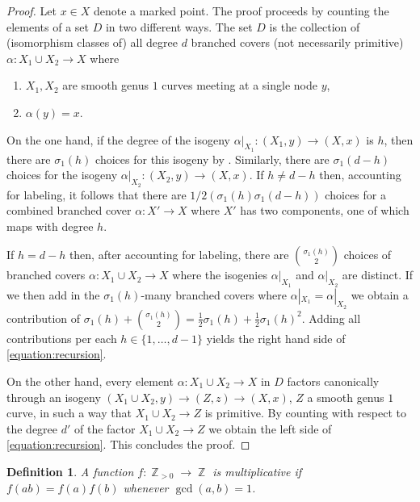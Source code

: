 \documentclass[reqno, 11pt]{amsart}
\newtheorem{definition}[theorem]{Definition}
\DeclareMathOperator{\Z}{\mathbb{Z}}
\begin{document}
\begin{proof}
    Let $x \in X$ denote a marked point. The proof proceeds by counting the elements of a set $D$ in two different ways.  The set $D$ is the collection of (isomorphism classes of) all degree $d$ branched covers (not necessarily primitive) $\alpha: X_{1} \cup X_{2} \to X$ where 
    \begin{enumerate}
        \item $X_{1},X_{2}$ are smooth genus $1$ curves meeting at a single node $y$,
        \item $\alpha(y) = x$.
    \end{enumerate}

    On the one hand, if the degree of the isogeny $\alpha|_{X_{1}}:(X_{1},y) \to (X,x)$ is $h$, then there are $\sigma_{1}(h)$ choices for this isogeny by . Similarly, there are $\sigma_{1}(d-h)$ choices for the isogeny $\alpha|_{X_{2}}:(X_{2},y) \to (X,x)$. If $h \neq d-h$ then, accounting for labeling, it follows that there are $1/2(\sigma_{1}(h)\sigma_{1}(d-h))$ choices for a combined branched cover $\alpha:X' \to X$ where $X'$ has two components, one of which maps with degree $h$.  

    If $h = d-h$ then, after accounting for labeling, there are ${\sigma_{1}(h) \choose 2}$ choices of branched covers $\alpha:X_{1} \cup X_{2} \to X$ where the isogenies $\alpha|_{X_{1}}$ and $\alpha|_{X_{2}}$ are distinct.  If we then add in the $\sigma_{1}(h)$-many branched covers where $\alpha|_{X_{1}} = \alpha|_{X_{2}}$ we obtain a contribution of $\sigma_{1}(h) + {\sigma_{1}(h) \choose 2} = \frac{1}{2}\sigma_{1}(h) + \frac{1}{2}\sigma_{1}(h)^{2}$.  Adding all contributions per each $h \in \{1, \dots, d-1\}$ yields the right hand side of \eqref{equation:recursion}.  

    On the other hand, every element $\alpha: X_{1} \cup X_{2} \to X$ in $D$ factors canonically through an isogeny $(X_{1} \cup X_{2},y) \to (Z,z) \to (X,x)$, $Z$ a smooth genus $1$ curve, in such a way that $X_{1} \cup X_{2} \to Z$ is primitive.  By counting with respect to the degree $d'$ of the factor $X_{1}\cup X_{2} \to Z$ we obtain the left side of \eqref{equation:recursion}.  This concludes the proof.
\end{proof}

\begin{definition}
    \label{definition:multiplicative} A function $f:\Z_{>0} \to \Z$ is \emph{multiplicative}  if $f(ab) = f(a)f(b)$ whenever $\gcd(a,b)=1$.
\end{definition}
\end{document}
